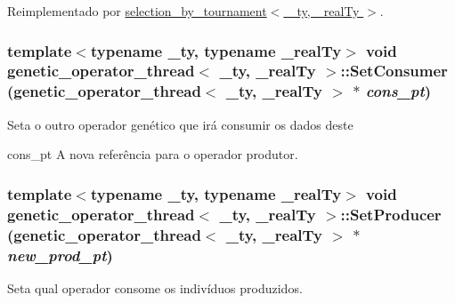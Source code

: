 Reimplementado por \hyperlink{classselection__by__tournament_a3e16cf77dd481a3ce1a01ac4edffa4ba}{selection\_\-by\_\-tournament$<$ \_\-ty, \_\-realTy $>$}.

\hypertarget{classgenetic__operator__thread_a2944e0158bc914db042fdcf22a4a4e70}{
\subsubsection[{SetConsumer}]{\setlength{\rightskip}{0pt plus 5cm}template$<$typename \_\-ty, typename \_\-realTy$>$ void {\bf genetic\_\-operator\_\-thread}$<$ \_\-ty, \_\-realTy $>$::SetConsumer ({\bf genetic\_\-operator\_\-thread}$<$ \_\-ty, \_\-realTy $>$ $\ast$ {\em cons\_\-pt})}}
\label{classgenetic__operator__thread_a2944e0158bc914db042fdcf22a4a4e70}
Seta o outro operador genético que irá consumir os dados deste

cons\_\-pt A nova referência para o operador produtor. \hypertarget{classgenetic__operator__thread_a435435aa8c4e9f50b041b40c7f63b599}{
\subsubsection[{SetProducer}]{\setlength{\rightskip}{0pt plus 5cm}template$<$typename \_\-ty, typename \_\-realTy$>$ void {\bf genetic\_\-operator\_\-thread}$<$ \_\-ty, \_\-realTy $>$::SetProducer ({\bf genetic\_\-operator\_\-thread}$<$ \_\-ty, \_\-realTy $>$ $\ast$ {\em new\_\-prod\_\-pt})}}
\label{classgenetic__operator__thread_a435435aa8c4e9f50b041b40c7f63b599}
Seta qual operador consome os indivíduos produzidos.

